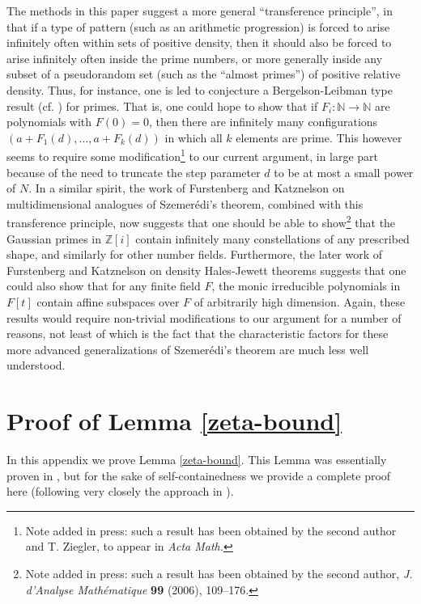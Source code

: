\documentclass[12pt,a4paper,reqno]{amsart}
\numberwithin{equation}{section}
\theoremstyle{plain}
\theoremstyle{definition}
\def\Z{{\mathbb Z}}
\def\vs{\vspace{11pt}}
\def\ni{\noindent}
\def\emph#1{{\it #1}}
\def\textbf#1{{\bf #1}}
\begin{document}
\ni The methods in this paper suggest a more general ``transference principle'', in that if a type of pattern (such as an arithmetic progression)
is forced to arise infinitely often within sets of positive density, then it should also be forced to arise infinitely often inside the prime numbers,
or more generally inside any subset of a pseudorandom set (such as the ``almost primes'') of positive relative density.  Thus, for instance,
one is led to conjecture a Bergelson-Leibman type result (cf. \cite{bergelson-leibman}) for primes. That is, one could hope to show that if $F_i : \mathbb{N} \rightarrow \mathbb{N}$ are polynomials with $F(0) = 0$, then there are infinitely many configurations $(a + F_1(d),\dots,a + F_k(d))$ in which all $k$ elements are prime. This however seems to require some modification\footnote{Note added in press: such a result has been obtained by the second author and T. Ziegler, to appear in \emph{Acta Math.}} to our current argument, in large part because
of the need to truncate the step parameter $d$ to be at most a small power of $N$.  In a similar spirit, the work of Furstenberg and Katznelson \cite{fk} on multidimensional analogues of Szemer\'edi's theorem, combined with this transference principle, now suggests that one should be able to show\footnote{Note added in press: such a result has been obtained by the second author, \emph{J. d'Analyse Math\'ematique} \textbf{99} (2006), 109--176.} that the Gaussian primes in $\Z[i]$ contain infinitely many constellations of any prescribed shape, and similarly for other number fields.  Furthermore, the later work of Furstenberg and Katznelson \cite{fk2} on density Hales-Jewett theorems suggests that one could also show 
that for any finite field $F$, the monic irreducible polynomials in $F[t]$ contain affine subspaces over $F$ of arbitrarily high dimension.
Again, these results would require non-trivial modifications to our argument for a number of reasons,
not least of which is the fact that the characteristic factors for these more advanced generalizations of Szemer\'edi's theorem are much 
less well understood.

\appendix
\section{Proof of Lemma \ref{zeta-bound}} \label{app}

\ni In this appendix we prove Lemma \ref{zeta-bound}. This Lemma was essentially proven in \cite{goldston-yildirim}, but for the sake of self-containedness
we provide a complete proof here (following very closely the approach
in \cite{goldston-yildirim}).\vs
\end{document}
